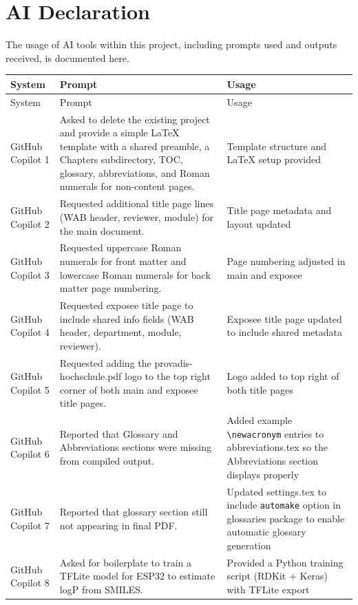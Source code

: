 \chapter*{AI Declaration}

The usage of AI tools within this project, including prompts used and outputs received, is documented here.

\renewcommand{\arraystretch}{1.5}
{\footnotesize
\begin{longtable}{p{} p{} p{}}
    \toprule
    System & Prompt & Usage \\
    \midrule
    \endfirsthead
    \toprule
    System & Prompt & Usage \\
    \midrule
    \endhead
    \midrule
    \endfoot
    \bottomrule
    \endlastfoot
    GitHub Copilot 1 & Asked to delete the existing project and provide a simple LaTeX template with a shared preamble, a Chapters subdirectory, TOC, glossary, abbreviations, and Roman numerals for non-content pages. & Template structure and LaTeX setup provided \\
    GitHub Copilot 2 & Requested additional title page lines (WAB header, reviewer, module) for the main document. & Title page metadata and layout updated \\
    GitHub Copilot 3 & Requested uppercase Roman numerals for front matter and lowercase Roman numerals for back matter page numbering. & Page numbering adjusted in main and exposee \\
    GitHub Copilot 4 & Requested exposee title page to include shared info fields (WAB header, department, module, reviewer). & Exposee title page updated to include shared metadata \\
    GitHub Copilot 5 & Requested adding the provadis-hochschule.pdf logo to the top right corner of both main and exposee title pages. & Logo added to top right of both title pages \\
    GitHub Copilot 6 & Reported that Glossary and Abbreviations sections were missing from compiled output. & Added example \texttt{\textbackslash newacronym} entries to abbreviations.tex so the Abbreviations section displays properly \\
    GitHub Copilot 7 & Reported that glossary section still not appearing in final PDF. & Updated settings.tex to include \texttt{automake} option in glossaries package to enable automatic glossary generation \\
    GitHub Copilot 8 & Asked for boilerplate to train a TFLite model for ESP32 to estimate logP from SMILES. & Provided a Python training script (RDKit + Keras) with TFLite export \\

\end{longtable}}
